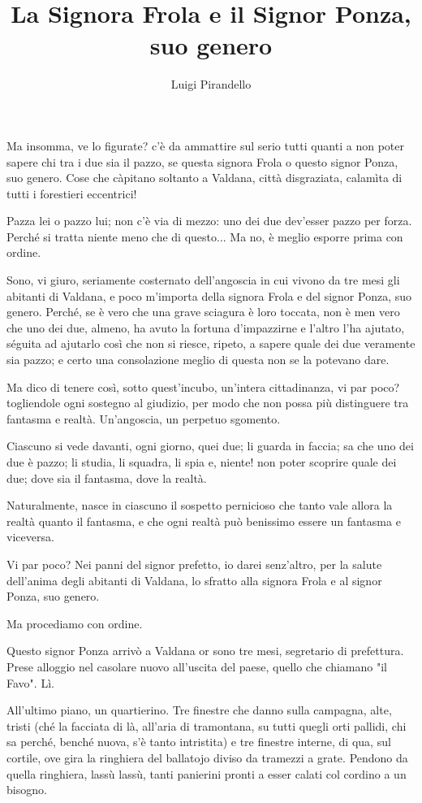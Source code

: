 \documentclass[12pt]{book}
\title{La Signora Frola e il Signor Ponza, suo genero}
\author{Luigi Pirandello}
\begin{document}
\maketitle
Ma insomma, ve lo figurate? c’è da ammattire sul serio tutti quanti a non poter sapere chi tra i due sia il pazzo, se questa signora Frola o questo signor Ponza, suo genero. Cose che càpitano soltanto a Valdana, città disgraziata, calamìta di tutti i forestieri eccentrici!

Pazza lei o pazzo lui; non c’è via di mezzo: uno dei due dev’esser pazzo per forza. Perché si tratta niente meno che di questo... Ma no, è meglio esporre prima con ordine.

Sono, vi giuro, seriamente costernato dell’angoscia in cui vivono da tre mesi gli abitanti di Valdana, e poco m’importa della signora Frola e del signor Ponza, suo genero. Perché, se è vero che una grave sciagura è loro toccata, non è men vero che uno dei due, almeno, ha avuto la fortuna d’impazzirne e l’altro l’ha ajutato, séguita ad ajutarlo così che non si riesce, ripeto, a sapere quale dei due veramente sia pazzo; e certo una consolazione meglio di questa non se la potevano dare.

 Ma dico di tenere così, sotto quest’incubo, un’intera cittadinanza, vi par poco? togliendole ogni sostegno al giudizio, per modo che non possa più distinguere tra fantasma e realtà. Un’angoscia, un perpetuo sgomento. 
 
 Ciascuno si vede davanti, ogni giorno, quei due; li guarda in faccia; sa che uno dei due è pazzo; li studia, li squadra, li spia e, niente! non poter scoprire quale dei due; dove sia il fantasma, dove la realtà. 
 
 Naturalmente, nasce in ciascuno il sospetto pernicioso che tanto vale allora la realtà quanto il fantasma, e che ogni realtà può benissimo essere un fantasma e viceversa. 
 
 Vi par poco? Nei panni del signor prefetto, io darei senz’altro, per la salute dell’anima degli abitanti di Valdana, lo sfratto alla signora Frola e al signor Ponza, suo genero.

Ma procediamo con ordine.

Questo signor Ponza arrivò a Valdana or sono tre mesi, segretario di prefettura. Prese alloggio nel casolare nuovo all’uscita del paese, quello che chiamano "il Favo". Lì.

 All’ultimo piano, un quartierino. Tre finestre che danno sulla campagna, alte, tristi (ché la facciata di là, all’aria di tramontana, su tutti quegli orti pallidi, chi sa perché, benché nuova, s’è tanto intristita) e tre finestre interne, di qua, sul cortile, ove gira la ringhiera del ballatojo diviso da tramezzi a grate. Pendono da quella ringhiera, lassù lassù, tanti panierini pronti a esser calati col cordino a un bisogno.
 
\end{document}
